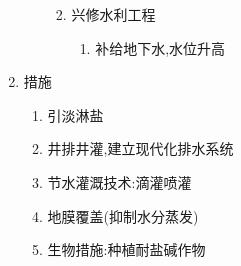 \documentclass[a4paper]{article}
\begin{document}
\begin{enumerate}
\begin{enumerate}
\begin{enumerate}
\begin{enumerate}
                \end{enumerate}
                \item 兴修水利工程
                \begin{enumerate}
                    \item 补给地下水,水位升高
                \end{enumerate}
            \end{enumerate}
        \end{enumerate}
        \item 措施
        \begin{enumerate}
            \item 引淡淋盐
            \item 井排井灌,建立现代化排水系统
            \item 节水灌溉技术:滴灌喷灌
            \item 地膜覆盖(抑制水分蒸发)
            \item 生物措施:种植耐盐碱作物
        \end{enumerate}
    \end{enumerate}
\end{document}
